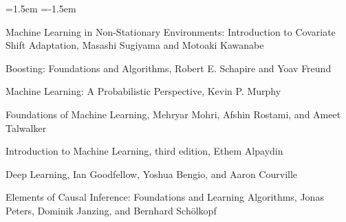 \begin{list}{}{\leftmargin=1.5em
 \itemindent=-1.5em\parsep=0pt\itemsep=4pt}
\item Machine Learning in Non-Stationary Environments: Introduction to Covariate Shift Adaptation, Masashi Sugiyama and Motoaki Kawanabe
\item Boosting: Foundations and Algorithms, Robert E. Schapire and Yoav Freund
\item Machine Learning: A Probabilistic Perspective, Kevin P. Murphy
\item Foundations of Machine Learning, Mehryar Mohri, Afshin Rostami, and Ameet Talwalker
\item Introduction to Machine Learning, third edition, Ethem Alpaydin
\item Deep Learning, Ian Goodfellow, Yoshua Bengio, and Aaron Courville
\item Elements of Causal Inference: Foundations and Learning Algorithms, Jonas Peters, Dominik Janzing, and Bernhard Schölkopf
\end{list}
\endgroup
